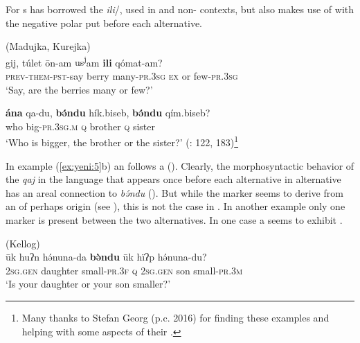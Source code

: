 For s  has borrowed the   \textit{ili}/, used in  and non- contexts, but also makes use of  with the negative polar  put before each alternative.

\ea%
    \label{ex:yeni:5}
     (Madujka, Kurejka)\\
    \ea
    gij,    túlet  \=on-{am} {us\textsuperscript{j}}{am} \textbf{{ili}} q{ómat}{-}{am?}\\
    \textsc{prev}-\textsc{them}-\textsc{pst}-say  berry  many-\textsc{pr}.3\textsc{sg}  \textsc{ex}  or  few-\textsc{pr}.3\textsc{sg}\\
    \glt ‘Say, are the berries many or few?’ 
    
    \ex
    \gll \textbf{{ána}} qa-du, \textbf{{b}}\textbf{{ə́}}\textbf{{ndu}} hík.biseb, \textbf{{b}}\textbf{{ə́}}\textbf{ndu} qím.biseb?\\
    who  big-\textsc{pr}.3\textsc{sg.m}  \textsc{q}    brother  \textsc{q} sister\\
    \glt ‘Who is bigger, the brother or the sister?’ (\citealt{KotorovaNefedov2015}: 122, 183)\footnote{Many thanks to Stefan Georg (p.c. 2016) for finding these examples and helping with some aspects of their .}
    \z
    \z

In example (\ref{ex:yeni:5}b) an  follows a  (). Clearly, the morphosyntactic behavior of the  \textit{qaj} in the  language  that appears once before each alternative in alternative  has an areal connection to  \textit{bə́}\textit{ndu} (). But while the  marker seems to derive from an  of perhaps  origin (see ), this is not the case in . In another example only one marker is present between the two alternatives. In one case a  seems to exhibit .

\ea%
    \label{ex:yeni:6}
     (Kellog)\\
    \ea
    \gll \=uk    huʔn    h\'ə{nuna-da} \textbf{{b}}\textbf{{\`ə}}\textbf{ndu} \=uk    hïʔp  h\'ə{nuna-du?}\\
    2\textsc{sg.gen}  daughter  small-\textsc{pr}.3\textsc{f} \textsc{q} 2\textsc{sg.gen}  son  small-\textsc{pr}.3\textsc{m}\\
    \glt ‘Is your daughter or your son smaller?’
    
